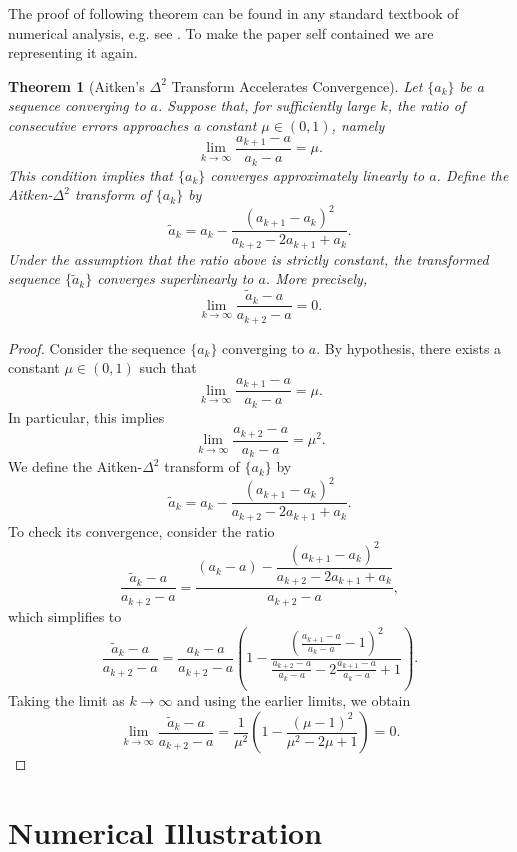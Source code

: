 \documentclass[12pt]{article}
\theoremstyle{plain}
\newtheorem{theorem}{Theorem}[section]
\theoremstyle{definition}
\begin{document}
The proof of following theorem can be found in any standard textbook of numerical analysis, e.g. see \cite{Po17}. To make the paper self contained we are representing it again.
\begin{theorem}[Aitken’s \(\Delta^2\) Transform Accelerates Convergence]\label{thm:aitken}
	Let \(\{a_k\}\) be a sequence converging to \(a\). Suppose that, for sufficiently large \(k\), the ratio of consecutive errors approaches a constant \(\mu \in (0,1)\), namely
	\[
	\lim_{k \to \infty} \frac{a_{k+1} - a}{a_k - a} = \mu.
	\]
	This condition implies that \(\{a_k\}\) converges approximately linearly to \(a\). Define the \emph{Aitken-\(\Delta^2\) transform} of \(\{a_k\}\) by
	\[
	\tilde{a}_k = a_k - \frac{(a_{k+1} - a_k)^2}{a_{k+2} - 2a_{k+1} + a_k}.
	\]
	Under the assumption that the ratio above is strictly constant, the transformed sequence \(\{\tilde{a}_k\}\) converges \emph{superlinearly} to \(a\). More precisely,
	\[
	\lim_{k \to \infty} \frac{\tilde{a}_{k} - a}{a_{k+2} - a} = 0.
	\]
\end{theorem}%
\begin{proof}
	Consider the sequence \(\{a_k\}\) converging to \(a\). By hypothesis, there exists a constant \(\mu \in (0,1)\) such that
	\[
	\lim_{k \to \infty} \frac{a_{k+1} - a}{a_k - a} = \mu.
	\]
	In particular, this implies
	\[
	\lim_{k \to \infty} \frac{a_{k+2} - a}{a_k - a} = \mu^2.
	\]
	We define the Aitken-\(\Delta^2\) transform of \(\{a_k\}\) by
	\[
	\tilde{a}_k = a_k - \frac{(a_{k+1} - a_k)^2}{a_{k+2} - 2a_{k+1} + a_k}.
	\]
	To check its convergence, consider the ratio
	\[
	\frac{\tilde{a}_k - a}{a_{k+2} - a}
	= \frac{(a_k - a) - \dfrac{(a_{k+1} - a_k)^2}{a_{k+2} - 2a_{k+1} + a_k}}{a_{k+2} - a},
	\]
	which simplifies to
	\begin{equation}\label{eq:aitken_ratio}
		\frac{\tilde{a}_k - a}{a_{k+2} - a}
		= \frac{a_k - a}{a_{k+2} - a}
		\left(
		1 - \frac{\left( \tfrac{a_{k+1} - a}{a_k - a} - 1 \right)^2}{
			\tfrac{a_{k+2} - a}{a_k - a} - 2\tfrac{a_{k+1} - a}{a_k - a} + 1}
		\right).
	\end{equation}
	Taking the limit as \(k \to \infty\) and using the earlier limits, we obtain
	\[
	\lim_{k \to \infty} \frac{\tilde{a}_{k} - a}{a_{k+2} - a}
	= \frac{1}{\mu^2}
	\left(
	1 - \frac{(\mu - 1)^2}{\mu^2 - 2\mu + 1}
	\right)
	= 0.
	\]
\end{proof}%




\section{Numerical Illustration}\label{Numericalexample}
\end{document}
